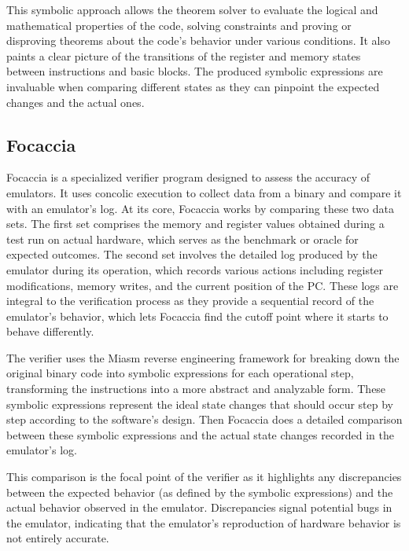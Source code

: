This symbolic approach allows the theorem solver to evaluate the logical and mathematical properties of the code, solving constraints and proving or disproving theorems about the code's behavior under various conditions.
It also paints a clear picture of the transitions of the register and memory states between instructions and basic blocks.
The produced symbolic expressions are invaluable when comparing different states as they can pinpoint the expected changes and the actual ones.

\subsection{Focaccia}
Focaccia is a specialized verifier program designed to assess the accuracy of emulators.
It uses concolic execution to collect data from a binary and compare it with an emulator's log.
At its core, Focaccia works by comparing these two data sets.
The first set comprises the memory and register values obtained during a test run on actual hardware, which serves as the benchmark or oracle for expected outcomes. 
The second set involves the detailed log produced by the emulator during its operation, which records various actions including register modifications, memory writes, and the current position of the \ac{PC}.
These logs are integral to the verification process as they provide a sequential record of the emulator's behavior, which lets Focaccia find the cutoff point where it starts to behave differently.

The verifier uses the Miasm \cite{desclaux2012miasm} reverse engineering framework for breaking down the original binary code into symbolic expressions for each operational step, transforming the instructions into a more abstract and analyzable form.
These symbolic expressions represent the ideal state changes that should occur step by step according to the software's design.
Then Focaccia does a detailed comparison between these symbolic expressions and the actual state changes recorded in the emulator's log.

This comparison is the focal point of the verifier as it highlights any discrepancies between the expected behavior (as defined by the symbolic expressions) and the actual behavior observed in the emulator.
Discrepancies signal potential bugs in the emulator, indicating that the emulator's reproduction of hardware behavior is not entirely accurate.


